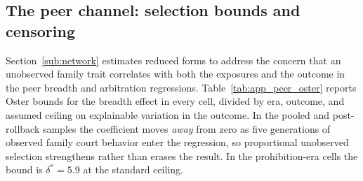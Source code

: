 \documentclass[12pt]{article}
\theoremstyle{definition}
\theoremstyle{remark}
\begin{document}
\subsection{The peer channel: selection bounds and censoring}
\label{app:censoring}

Section~\ref{sub:network} estimates reduced forms to address the concern that an unobserved family trait correlates with both the exposures and the outcome in the peer breadth and arbitration regressions. Table~\ref{tab:app_peer_oster} reports Oster bounds for the breadth effect in every cell, divided by era, outcome, and assumed ceiling on explainable variation in the outcome. In the pooled and post-rollback samples the coefficient moves \emph{away} from zero as five generations of observed family court behavior enter the regression, so proportional unobserved selection strengthens rather than erases the result. In the prohibition-era cells the bound is $\delta^\ast=5.9$ at the standard ceiling.
\end{document}
